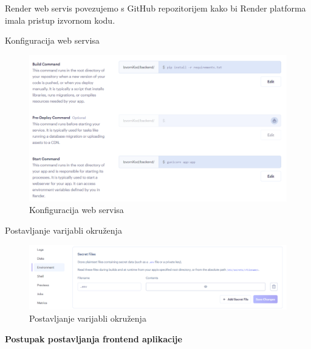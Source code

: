 \begin{packed_item}
         Render web servis povezujemo s GitHub repozitorijem kako bi Render platforma imala pristup izvornom kodu.
         
        \item Konfiguracija web servisa \\
        
        \begin{figure}
        \includegraphics[width=\textwidth]{slike/Backend3.PNG} %
			\caption{Konfiguracija web servisa}
			\label{fig:backend3} %
		\end{figure}
      
		
        \item Postavljanje varijabli okruženja \\
        \begin{figure}
        \includegraphics[width=\textwidth]{slike/Backend4.PNG} %
			\caption{Postavljanje varijabli okruženja}
			\label{fig:backend4} %
		\end{figure}
        
        

\end{packed_item}

\textbf{Postupak postavljanja frontend aplikacije}

